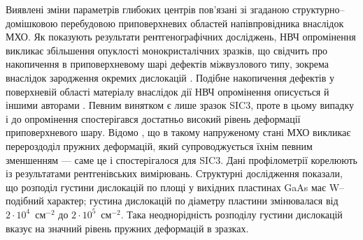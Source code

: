 Виявлені зміни параметрів глибоких центрів пов'язані зі згаданою структурно--домішковою перебудовою приповерхневих областей напівпровідника внаслідок МХО.
Як показують результати рентгенографічних досліджень, НВЧ опромінення викликає збільшення опуклості монокристалічних зразків, що свідчить про накопичення в приповерхневому шарі дефектів міжвузлового типу,
зокрема внаслідок зародження окремих дислокацій  \cite{Boltovets,Konakova2012FTP}.
Подібне накопичення дефектів у поверхневій області матеріалу внаслідок дії НВЧ опромінення описується й іншими авторами \cite{Boltovets,Belyaev1998JTFr,Konakova2015}.
Певним винятком є лише зразок SIC3, проте в цьому випадку і до опромінення спостерігався достатньо високий рівень
деформації приповерхневого шару.
Відомо \cite{Bacherikov2003r,Pashkov1994r,Boltovets,Kr1996,Milenin1994,BelyaevIntac}, що в такому напруженому стані МХО викликає перероздоділ пружних деформацій, який супроводжується їхнім певним зменшенням --- саме це і спостерігалося для SIC3.
Дані профілометрії корелюють із результатами рентгенівських вимірювань.
Структурні дослідження показали, що розподіл густини дислокацій по площі у вихідних пластинах GaAs має W--подібний характер;
густина дислокацій по діаметру пластини змінювалася від $2\cdot10^{4}$~см$^{-2}$ до $2\cdot10^{5}$~см$^{-2}$.
Така неоднорідність розподілу густини дислокацій вказує на значний рівень пружних деформацій в зразках.


